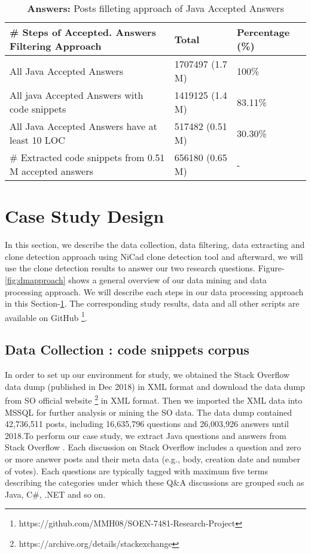 \documentclass[conference]{IEEEtran}
\begin{document}
	
	\begin{table*}[ht]
		\caption{\textbf{Answers:} Posts filleting approach of Java Accepted Answers}
		\centering
		\begin{tabular}{l l l }
			\hline\hline
			\# Steps of Accepted. Answers Filtering Approach & Total & Percentage (\%) \\ [0.5ex]
			\hline
			All Java Accepted Answers & 1707497 (1.7 M) & 100\% \\
			All java Accepted Answers with code snippets & 1419125 (1.4 M) & 83.11\% \\
			All Java Accepted Answers have at least 10 LOC  & 517482 (0.51 M) & 30.30\% \\
			\# Extracted code snippets from 0.51 M accepted answers & 656180 (0.65 M) & - \\  [1ex]
			\hline
		\end{tabular}
		\label{table:JavaAnswers}
	\end{table*}
	
	\section{Case Study Design}\label{CSD}
	In this section, we describe the data collection, data filtering, data extracting and clone detection approach using NiCad clone detection tool and afterward, we will use the clone detection results to answer our two research questions. Figure-\ref{fig:dmapproach} shows a general overview of our data mining and data processing approach. We will describe each steps in our data processing approach in this Section-\ref{CSD}. The corresponding study results, data and all other scripts are available on GitHub \footnote{https://github.com/MMH08/SOEN-7481-Research-Project}.	

	
	
	\subsection{Data Collection : code snippets corpus}
	In order to set up our environment for study, we obtained the Stack Overflow data dump  (published in Dec 2018) in XML format and download the data dump from SO official website \footnote{https://archive.org/details/stackexchange} in XML format. Then we imported the XML data into MSSQL for further analysis or mining the SO data. The data dump contained 42,736,511 posts, including 16,635,796 questions and 26,003,926 answers until 2018.To perform our case study, we extract Java questions and answers from Stack Overflow . Each discussion on Stack Overflow includes a question and zero or more answer posts and their meta data (e.g., body, creation date and number of votes). Each questions are typically tagged with maximum five terms describing the categories under which these Q\&A discussions are grouped such as Java, C\#, .NET and so on.
	
\end{document}
